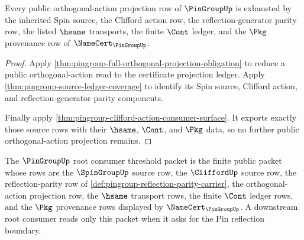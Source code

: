 \begin{theorem}
\label{thm:pingroup-orthogonal-projection-ledger-exhaustion}
Every public orthogonal-action projection row of $\PinGroupUp$ is exhausted by
the inherited Spin source, the Clifford action row, the reflection-generator
parity row, the listed $\hsame$ transports, the finite $\Cont$ ledger, and the
$\Pkg$ provenance row of $\NameCert_{\PinGroupUp}$.
\end{theorem}
\begin{proof}
Apply \autoref{thm:pingroup-full-orthogonal-projection-obligation} to reduce a
public orthogonal-action read to the certificate projection ledger. Apply
\autoref{thm:pingroup-source-ledger-coverage} to identify its Spin source,
Clifford action, and reflection-generator parity components.

Finally apply \autoref{thm:pingroup-clifford-action-consumer-surface}. It
exports exactly those source rows with their $\hsame$, $\Cont$, and $\Pkg$
data, so no further public orthogonal-action projection remains.
\end{proof}

\begin{definition}
\label{def:pingroup-root-consumer-threshold-packet}
The $\PinGroupUp$ root consumer threshold packet is the finite public packet
whose rows are the $\SpinGroupUp$ source row, the $\CliffordUp$ source row, the
reflection-parity row of
\autoref{def:pingroup-reflection-parity-carrier}, the orthogonal-action
projection row, the $\hsame$ transport rows, the finite $\Cont$ ledger rows,
and the $\Pkg$ provenance rows displayed by $\NameCert_{\PinGroupUp}$. A
downstream root consumer reads only this packet when it asks for the Pin
reflection boundary.
\end{definition}

